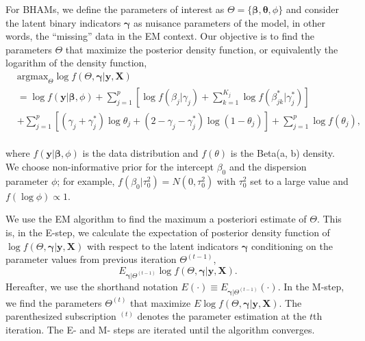 \documentclass[AMA,STIX1COL,]{WileyNJD-v2}
\begin{document}
For BHAMs, we define the parameters of interest as
\(\Theta = \{\boldsymbol{\beta}, \boldsymbol{\theta}, \phi\}\) and
consider the latent binary indicators \(\boldsymbol{\gamma}\) as
nuisance parameters of the model, in other words, the ``missing'' data
in the EM context. Our objective is to find the parameters \(\Theta\)
that maximize the posterior density function, or equivalently the
logarithm of the density function, \[
\begin{aligned}
& \text{argmax}_{\Theta}
\log f(\Theta, \boldsymbol{\gamma}| \textbf{y}, \textbf{X}) \\
&= \log f(\textbf{y}|\boldsymbol{\beta}, \phi) + \sum\limits_{j=1}^p\left[\log f(\beta_j|\gamma_j)+\sum\limits_{k=1}^{K_j} \log f(\beta^{*}_{jk}|\gamma^{*}_{j})\right]\\
& +\sum\limits_{j=1}^{p} \left[ (\gamma_j+\gamma_{j}^{*})\log \theta_j + (2-\gamma_j-\gamma_{j}^{*}) \log (1-\theta_j)\right] +  \sum\limits_{j=1}^{p}\log f(\theta_j),
\end{aligned}
\]\\
where \(f(\textbf{y}|\boldsymbol{\beta}, \phi)\) is the data
distribution and \(f(\theta)\) is the Beta(a, b) density. We choose
non-informative prior for the intercept \(\beta_0\) and the dispersion
parameter \(\phi\); for example, \(f(\beta_0|\tau_0^2)=N(0,\tau_0^2)\)
with \(\tau^2_0\) set to a large value and \(f(\log \phi) \propto 1\).

We use the EM algorithm to find the maximum a posteriori estimate of
\(\Theta\). This is, in the E-step, we calculate the expectation of
posterior density function of
\(\log f(\Theta, \boldsymbol{\gamma}| \textbf{y}, \textbf{X})\) with
respect to the latent indicators \(\boldsymbol{\gamma}\) conditioning on
the parameter values from previous iteration \(\Theta^{(t-1)}\), \[
E_{\boldsymbol{\gamma}|\Theta^{(t-1)}}\log f(\Theta, \boldsymbol{\gamma}| \textbf{y}, \textbf{X}) .
\] Hereafter, we use the shorthand notation
\(E(\cdot)\equiv E_{\boldsymbol{\gamma}|\Theta^{(t-1)}}(\cdot)\). In the
M-step, we find the parameters \(\Theta^{(t)}\) that maximize
\(E\log f(\Theta, \boldsymbol{\gamma}| \textbf{y}, \textbf{X})\). The
parenthesized subscription \(^{(t)}\) denotes the parameter estimation
at the \(t\)th iteration. The E- and M- steps are iterated until the
algorithm converges.
\end{document}
